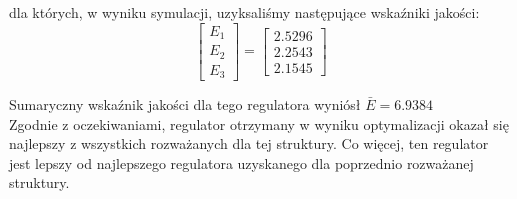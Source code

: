 dla których, w wyniku symulacji, uzyksaliśmy następujące wskaźniki jakości:\\

\[
\begin{bmatrix}
    E_{\mathrm{1}} \\
    E_{\mathrm{2}} \\
    E_{\mathrm{3}} 
\end{bmatrix}
= 
\begin{bmatrix}
    \num{2.5296} \\
    \num{2.2543} \\
    \num{2.1545}
\end{bmatrix}
\]

Sumaryczny wskaźnik jakości dla tego regulatora wyniósł $\bar{E} = \num{6.9384}$\\

Zgodnie z oczekiwaniami, regulator otrzymany w wyniku optymalizacji okazał się najlepszy z wszystkich
rozważanych dla tej struktury. Co więcej, ten regulator jest lepszy od najlepszego regulatora uzyskanego
dla poprzednio rozważanej struktury.


